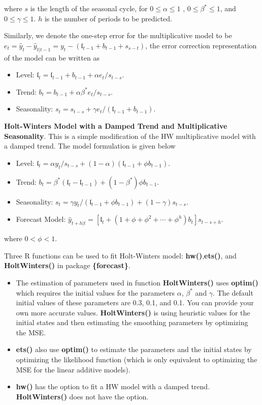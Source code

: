 \documentclass[
]{book}
\begin{document}
where \(s\) is the length of the seasonal cycle, for \(0 \le \alpha \le 1\) , \(0 \le \beta^* \le 1\), and \(0 \le \gamma \le 1\). \(h\) is the number of periods to be predicted.

Similarly, we denote the one-step error for the multiplicative model to be \(e_t=\hat{y}_t-\hat{y}_{t|t-1} = y_t -(\mathfrak{l}_{t-1}+b_{t-1} + s_{s-t})\), the error correction representation of the model can be written as

\begin{itemize}
\item
  Level: \(\mathfrak{l}_t = \mathfrak{l}_{t-1} + b_{t-1} + \alpha e_t/s_{t-s}\).
\item
  Trend: \(b_t = b_{t-1} + \alpha\beta^* e_t / s_{t-s}\).
\item
  Seasonality: \(s_t = s_{t-s} + \gamma e_t /(\mathfrak{l}_{t-1}+b_{t-1})\).
\end{itemize}

\textbf{Holt-Winters Model with a Damped Trend and Multiplicative Seasonality}. This is a simple modification of the HW multiplicative model with a damped trend. The model formulation is given below

\begin{itemize}
\item
  Level: \(\mathfrak{l}_t = \alpha y_t/s_{t-s} + (1-\alpha)(\mathfrak{l}_{t-1}+\phi b_{t-1})\).
\item
  Trend: \(b_t = \beta^*(\mathfrak{l}_t - \mathfrak{l}_{t-1}) + (1-\beta^*)\phi b_{t-1}\).
\item
  Seasonality: \(s_t = \gamma y_t/(\mathfrak{l}_{t-1}+\phi b_{t-1}) + (1-\gamma)s_{t-s}\).
\item
  Forecast Model: \(\hat{y}_{t+h|t}=\left[\mathfrak{l}_t +(1 + \phi +\phi^2+ \cdots + \phi^h)b_t \right]s_{t-s+h}\).
\end{itemize}

where \(0< \phi < 1\).

Three R functions can be used to fit Holt-Winters model: \textbf{hw()},\textbf{ets()}, and \textbf{HoltWinters()} in package \textbf{\{forecast\}}.

\begin{itemize}
\item
  The estimation of parameters used in function \textbf{HoltWinters()} uses \textbf{optim()} which requires the initial values for the parameters \(\alpha\), \(\beta^*\) and \(\gamma\). The default initial values of these parameters are 0.3, 0.1, and 0.1. You can provide your own more accurate values. \textbf{HoltWinters()} is using heuristic values for the initial states and then estimating the smoothing parameters by optimizing the MSE.
\item
  \textbf{ets()} also use \textbf{optim()} to estimate the parameters and the initial states by optimizing the likelihood function (which is only equivalent to optimizing the MSE for the linear additive models).
\item
  \textbf{hw()} has the option to fit a HW model with a damped trend. \textbf{HoltWinters()} does not have the option.
\end{itemize}
\end{document}
